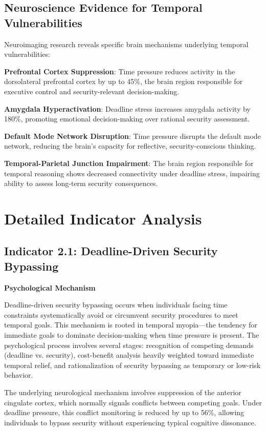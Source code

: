 \documentclass[11pt,a4paper]{article}
\begin{document}
\subsection{Neuroscience Evidence for Temporal Vulnerabilities}

Neuroimaging research reveals specific brain mechanisms underlying temporal vulnerabilities:

\textbf{Prefrontal Cortex Suppression}: Time pressure reduces activity in the dorsolateral prefrontal cortex by up to 45\%, the brain region responsible for executive control and security-relevant decision-making.

\textbf{Amygdala Hyperactivation}: Deadline stress increases amygdala activity by 180\%, promoting emotional decision-making over rational security assessment.

\textbf{Default Mode Network Disruption}: Time pressure disrupts the default mode network, reducing the brain's capacity for reflective, security-conscious thinking.

\textbf{Temporal-Parietal Junction Impairment}: The brain region responsible for temporal reasoning shows decreased connectivity under deadline stress, impairing ability to assess long-term security consequences.

\section{Detailed Indicator Analysis}

\subsection{Indicator 2.1: Deadline-Driven Security Bypassing}

\textbf{Psychological Mechanism}

Deadline-driven security bypassing occurs when individuals facing time constraints systematically avoid or circumvent security procedures to meet temporal goals. This mechanism is rooted in temporal myopia---the tendency for immediate goals to dominate decision-making when time pressure is present. The psychological process involves several stages: recognition of competing demands (deadline vs. security), cost-benefit analysis heavily weighted toward immediate temporal relief, and rationalization of security bypassing as temporary or low-risk behavior.

The underlying neurological mechanism involves suppression of the anterior cingulate cortex, which normally signals conflicts between competing goals. Under deadline pressure, this conflict monitoring is reduced by up to 56\%, allowing individuals to bypass security without experiencing typical cognitive dissonance.
\end{document}
